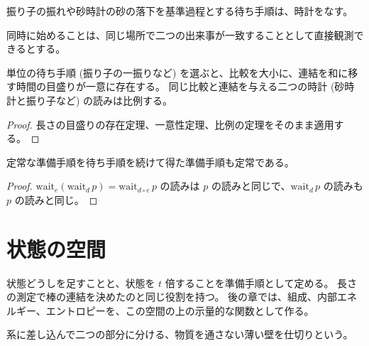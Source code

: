 \begin{empirical}[時計がある]
  \label{emp:clock}
  \leanok
  振り子の振れや砂時計の砂の落下を基準過程とする待ち手順は、時計をなす。
\end{empirical}

同時に始めることは、同じ場所で二つの出来事が一致することとして直接観測できるとする。

\begin{theorem}[時間の目盛り]
  \label{thm:time}
  \leanok
  単位の待ち手順 (振り子の一振りなど) を選ぶと、比較を大小に、連結を和に移す時間の目盛りが一意に存在する。
  同じ比較と連結を与える二つの時計 (砂時計と振り子など) の読みは比例する。
\end{theorem}

\begin{proof}
  \leanok
  長さの目盛りの存在定理、一意性定理、比例の定理をそのまま適用する。
\end{proof}

\begin{theorem}[待ち手順を続けても定常]
  \label{thm:stationary-wait}
  \leanok
  定常な準備手順を待ち手順を続けて得た準備手順も定常である。
\end{theorem}

\begin{proof}
  \leanok
  $\mathrm{wait}_e(\mathrm{wait}_d\, p) = \mathrm{wait}_{d \circ e}\, p$ の読みは $p$ の読みと同じで、$\mathrm{wait}_d\, p$ の読みも $p$ の読みと同じ。
\end{proof}

\section{状態の空間}

状態どうしを足すことと、状態を $t$ 倍することを準備手順として定める。
長さの測定で棒の連結を決めたのと同じ役割を持つ。
後の章では、組成、内部エネルギー、エントロピーを、この空間の上の示量的な関数として作る。

\begin{definition}[仕切り]
  \label{def:partition}
  系に差し込んで二つの部分に分ける、物質を通さない薄い壁を仕切りという。
\end{definition}


